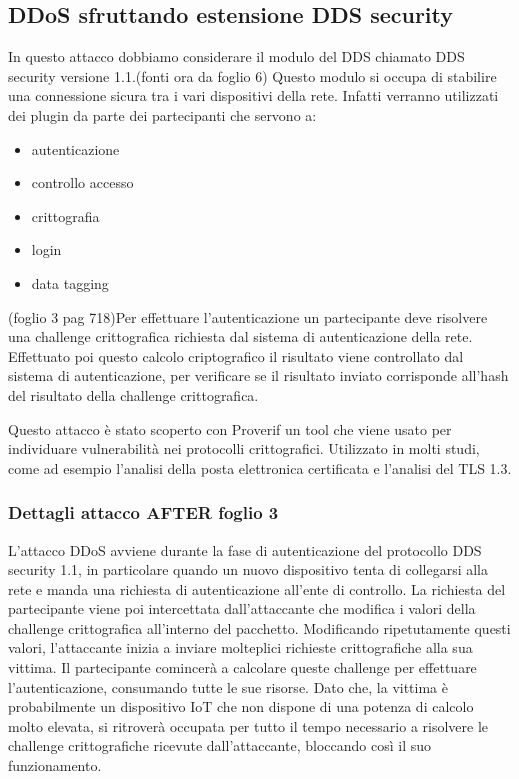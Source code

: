 \subsection{DDoS sfruttando estensione DDS security}
In questo attacco dobbiamo considerare il modulo del DDS chiamato DDS security
versione 1.1.(fonti ora da foglio 6) Questo modulo si occupa di stabilire una
connessione sicura tra i vari dispositivi della rete. Infatti verranno utilizzati
dei plugin da parte dei partecipanti che servono a: 
\begin{itemize}
    \item autenticazione
    \item controllo accesso
    \item crittografia
    \item login
    \item data tagging
\end{itemize}
(foglio 3 pag 718)Per effettuare l'autenticazione un partecipante deve
risolvere una challenge crittografica richiesta dal sistema di autenticazione
della rete. Effettuato poi questo calcolo criptografico il risultato viene
controllato dal sistema di autenticazione, per verificare se il risultato
inviato corrisponde all'hash del risultato della challenge crittografica.

Questo attacco è stato scoperto con Proverif un tool che viene usato
per individuare vulnerabilità nei protocolli crittografici. 
Utilizzato in molti studi, come ad esempio l'analisi della posta elettronica
certificata e l'analisi del TLS 1.3.

\subsubsection{Dettagli attacco AFTER foglio 3}
L'attacco DDoS avviene durante la fase di autenticazione del protocollo
DDS security 1.1, in particolare quando un nuovo dispositivo tenta di
collegarsi alla rete e manda una richiesta di autenticazione
all'ente di controllo. La richiesta del partecipante viene poi intercettata
dall'attaccante che modifica i valori della challenge crittografica 
all'interno del pacchetto. Modificando ripetutamente questi valori, l'attaccante
inizia a inviare molteplici richieste crittografiche alla sua vittima.
Il partecipante comincerà a calcolare queste challenge per effettuare
l'autenticazione, consumando tutte le sue risorse.
Dato che, la vittima è probabilmente un dispositivo IoT
che non dispone di una potenza di calcolo molto elevata, si ritroverà
occupata per tutto il tempo necessario a risolvere le challenge crittografiche
ricevute dall'attaccante, bloccando così il suo funzionamento.


